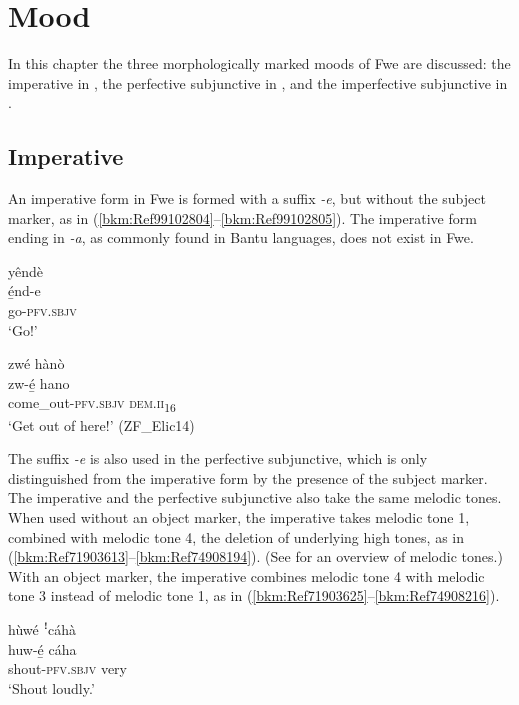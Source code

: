 \chapter{Mood}
\label{bkm:Ref99112450}\label{bkm:Ref99112433}\label{bkm:Ref99112414}\hypertarget{Toc75352699}{}
In this chapter the three morphologically marked moods of Fwe are discussed: the imperative in , the perfective subjunctive in , and the imperfective subjunctive in .

\section{Imperative}
\label{bkm:Ref489881434}\hypertarget{Toc75352700}{}
An imperative form in Fwe is formed with a suffix \textit{-e}, but without the subject marker, as in (\ref{bkm:Ref99102804}--\ref{bkm:Ref99102805}). The imperative form ending in \textit{-a}, as commonly found in Bantu languages, does not exist in Fwe.

\ea
\label{bkm:Ref99102804}
\glll yêndè\\
é̲nd-e\\
go-\textsc{pfv}.\textsc{sbjv}\\
\glt ‘Go!’
\z

\ea
\label{bkm:Ref99102805}
zwé hànò\\
\gll zw-é̲      hano\\
come\_out-\textsc{pfv}.\textsc{sbjv}  \textsc{dem}.\textsc{ii}\textsubscript{16}\\
\glt ‘Get out of here!’ (ZF\_Elic14)
\z

The suffix \textit{-e} is also used in the perfective subjunctive, which is only distinguished from the imperative form by the presence of the subject marker. The imperative and the perfective subjunctive also take the same melodic tones. When used without an object marker, the imperative takes melodic tone 1, combined with melodic tone 4, the deletion of underlying high tones, as in (\ref{bkm:Ref71903613}--\ref{bkm:Ref74908194}). (See  for an overview of melodic tones.) With an object marker, the imperative combines melodic tone 4 with melodic tone 3 instead of melodic tone 1, as in (\ref{bkm:Ref71903625}--\ref{bkm:Ref74908216}).

\ea
\label{bkm:Ref71903613}
hùwé ꜝcáhà\\
\gll huw-é̲    cáha\\
shout-\textsc{pfv}.\textsc{sbjv}  very\\
\glt ‘Shout loudly.’
\z

